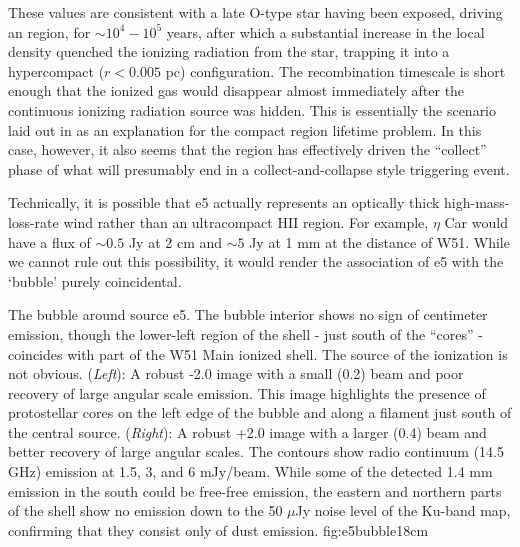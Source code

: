 \documentclass{emulateapj}
\begin{document}
These values are consistent with a late O-type star having been exposed,
driving an \hii region, for $\sim10^4-10^5$ years, after which a substantial
increase in the local density quenched the ionizing radiation from the star,
trapping it into a hypercompact ($r<0.005$ pc) configuration.  The
recombination timescale is short enough that the ionized gas would disappear
almost immediately after the continuous ionizing radiation source was hidden.
This is essentially the scenario laid out in \citet{de-Pree2014a} as an
explanation for the compact \hii region lifetime problem.  In this case,
however, it also seems that the \hii region has effectively driven the
``collect'' phase of what will presumably end in a collect-and-collapse style
triggering event.

Technically, it is possible that e5 actually represents an optically thick
high-mass-loss-rate wind rather than an ultracompact HII region. 
For example, $\eta$ Car would have a flux of $\sim0.5$ Jy at 2 cm
and $\sim5$ Jy at 1 mm at the distance of W51.  While we cannot rule out
this possibility, it would render the association of e5 with the `bubble'
purely coincidental.

{The bubble around source e5.  The bubble interior shows no sign of centimeter
emission, though the lower-left region of the shell - just south of the
``cores'' - coincides with part of the W51 Main ionized shell.  The source of
the ionization is not obvious.
({\it Left}): A robust -2.0 image with a small (0.2\arcsec) beam and poor
recovery of large angular scale emission.  This image highlights the presence
of protostellar cores on the left edge of the bubble and along a filament just
south of the central source.
({\it Right}): A robust +2.0 image with a larger (0.4\arcsec) beam and better
recovery of large angular scales.  The contours show radio continuum (14.5 GHz)
emission at 1.5, 3, and 6 mJy/beam.  While some of the detected 1.4 mm emission
in the south could be free-free emission, the eastern and northern parts of the
shell show no emission down to the 50 $\mu$Jy noise level of the Ku-band map,
confirming that they consist only of dust emission.
}{fig:e5bubble}{1}{8cm}
\end{document}

